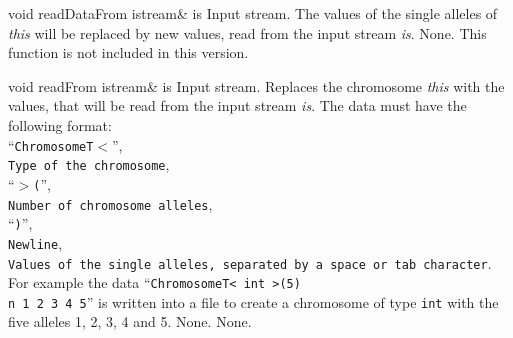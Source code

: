 \vspace*{4ex}

    \setNormalInstance
    \printMethodWithOneParam
    {void} 
    {readDataFrom}
    {istream\&} 
    {is} 
    {Input stream.}
    {The values of the single alleles of {\em this} will be replaced
by new values, read from the input stream {\em is}.}
    {None.}
    {This function is not included in this version.}

\clearpage

    \setNormalInstance
    \printMethodWithOneParam
    {void}
    {readFrom}
    {istream\&} 
    {is}
    {Input stream.}
    {Replaces the chromosome {\em this} with the values, that will be
read from the input stream {\em is}. The data must have the 
following format:\\
     ``{\tt ChromosomeT$<$}'',\\
     {\tt Type of the chromosome},\\ 
     ``{\tt $>$(}'',\\
     {\tt Number of chromosome alleles},\\ 
     ``{\tt )}'',\\ 
     {\tt Newline},\\
     {\tt Values of the single alleles, 
      separated by a space or tab character}.\\
     For example the data ``{\tt ChromosomeT< int >(5)\\n 1 2 3 4 5}''  
     is written into a file to create a chromosome of type {\tt int}
     with the five alleles 1, 2, 3, 4 and 5.}
    {None.}
    {None.}









